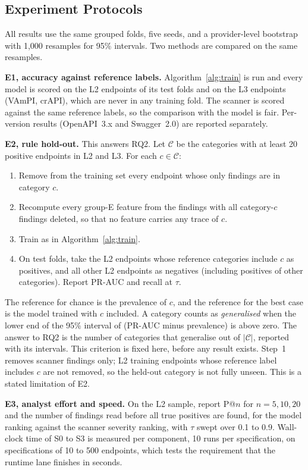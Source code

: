 \documentclass[conference]{IEEEtran}
\begin{document}
\subsection{Experiment Protocols}
All results use the same grouped folds, five seeds, and a provider-level bootstrap with 1{,}000
resamples for 95\% intervals. Two methods are compared on the same resamples.

\textbf{E1, accuracy against reference labels.} Algorithm~\ref{alg:train} is run and every model
is scored on the L2 endpoints of its test folds and on the L3 endpoints (VAmPI, crAPI), which are never in any training fold. The scanner is scored against the
same reference labels, so the comparison with the model is fair. Per-version results (OpenAPI~3.x
and Swagger~2.0) are reported separately.

\textbf{E2, rule hold-out.} This answers RQ2. Let $\mathcal{C}$ be the categories with at
least 20 positive endpoints in L2 and L3. For each $c\in\mathcal{C}$:
\begin{enumerate}
\item Remove from the training set every endpoint whose only findings are in category $c$.
\item Recompute every group-E feature from the findings with all category-$c$ findings
deleted, so that no feature carries any trace of $c$.
\item Train as in Algorithm~\ref{alg:train}.
\item On test folds, take the L2 endpoints whose reference categories include $c$ as
positives, and all other L2 endpoints as negatives (including positives of other categories). Report PR-AUC and recall at $\tau$.
\end{enumerate}
The reference for chance is the prevalence of $c$, and the reference for the best case is the
model trained with $c$ included. A category counts as \emph{generalised} when the lower end of
the 95\% interval of (PR-AUC minus prevalence) is above zero. The answer to RQ2 is the number
of categories that generalise out of $|\mathcal{C}|$, reported with its intervals. This
criterion is fixed here, before any result exists. Step~1 removes scanner findings only; L2 training endpoints whose reference label includes $c$ are not removed, so the held-out category is not fully unseen. This is a stated limitation of E2.

\textbf{E3, analyst effort and speed.} On the L2 sample, report P@$n$ for $n=5,10,20$ and the
number of findings read before all true positives are found, for the model ranking against the
scanner severity ranking, with $\tau$ swept over 0.1 to 0.9. Wall-clock time of S0 to S3 is
measured per component, 10 runs per specification, on specifications of 10 to 500 endpoints,
which tests the requirement that the runtime lane finishes in seconds.
\end{document}
